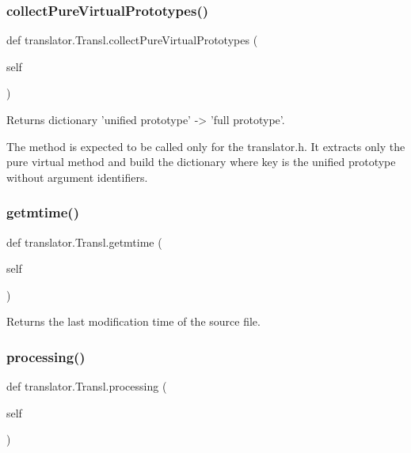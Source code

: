 \subsubsection{\texorpdfstring{collectPureVirtualPrototypes()}{collectPureVirtualPrototypes()}}
{\footnotesize\ttfamily def translator.\+Transl.\+collect\+Pure\+Virtual\+Prototypes (\begin{DoxyParamCaption}\item[{}]{self }\end{DoxyParamCaption})}

\begin{DoxyVerb}Returns dictionary 'unified prototype' -> 'full prototype'.

The method is expected to be called only for the translator.h. It
extracts only the pure virtual method and build the dictionary where
key is the unified prototype without argument identifiers.\end{DoxyVerb}
 \mbox{\label{classtranslator_1_1_transl_affb114b804b7bccb4ba4dd5b492009f7}} 
\subsubsection{\texorpdfstring{getmtime()}{getmtime()}}
{\footnotesize\ttfamily def translator.\+Transl.\+getmtime (\begin{DoxyParamCaption}\item[{}]{self }\end{DoxyParamCaption})}

\begin{DoxyVerb}Returns the last modification time of the source file.\end{DoxyVerb}
 \mbox{\label{classtranslator_1_1_transl_af3735bfc96ce58cc9c035d8091bac85b}} 
\subsubsection{\texorpdfstring{processing()}{processing()}}
{\footnotesize\ttfamily def translator.\+Transl.\+processing (\begin{DoxyParamCaption}\item[{}]{self }\end{DoxyParamCaption})}

